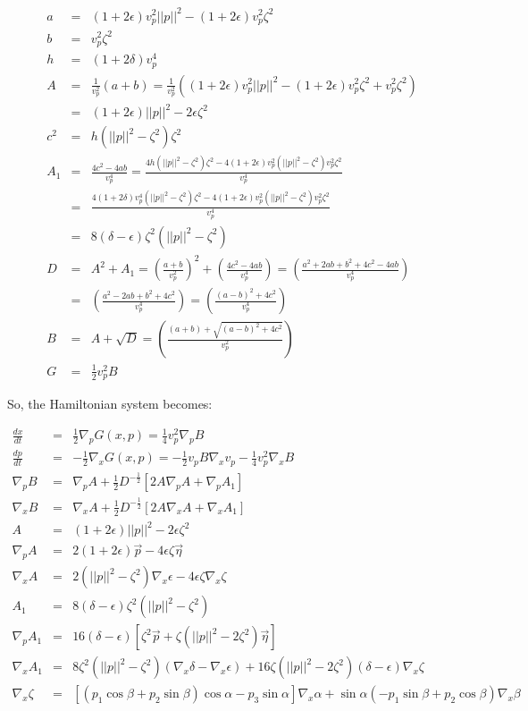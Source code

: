 \documentclass[12pt]{article}
\begin{document}
\begin{eqnarray}
a  &=& (1+2\epsilon)v_p^2||p||^2-(1+2\epsilon)v_p^2\zeta^2 \\
b  &=& v_p^2\zeta^2 \\
h  &=& (1+2\delta)v_p^4 \\
A  &=& \frac{1}{v_p^2}\left(a+b\right)= \frac{1}{v_p^2}\left((1+2\epsilon)v_p^2||p||^2-(1+2\epsilon)v_p^2\zeta^2+v_p^2\zeta^2\right)\\
   &=& (1+2\epsilon)||p||^2-2\epsilon\zeta^2 \\
c^2&=& h(||p||^2-\zeta^2)\zeta^2 \\
A_1&=& \frac{4c^2-4ab}{v_p^4}=\frac{4h(||p||^2-\zeta^2)\zeta^2-4(1+2\epsilon)v_p^2(||p||^2-\zeta^2)v_p^2\zeta^2}{v_p^4}\\
   &=& \frac{4(1+2\delta)v_p^4(||p||^2-\zeta^2)\zeta^2-4(1+2\epsilon)v_p^2(||p||^2-\zeta^2)v_p^2\zeta^2}{v_p^4}\\
   &=& 8(\delta-\epsilon)\zeta^2(||p||^2-\zeta^2) \\
D  &=& A^2+A_1 = \left(\frac{a+b}{v_p^2}\right)^2 + \left(\frac{4c^2-4ab}{v_p^4}\right) = \left(\frac{a^2+2ab+b^2+4c^2-4ab}{v_p^4}\right) \nonumber \\
   &=& \left(\frac{a^2-2ab+b^2+4c^2}{v_p^4}\right) = \left(\frac{(a-b)^2+4c^2}{v_p^4}\right) \\
B  &=& A+\sqrt{D} = \left(\frac{(a+b)+\sqrt{(a-b)^2+4c^2}}{v_p^2}\right)\\
G  &=& \frac{1}{2} v_p^2 B
\end{eqnarray}

So, the Hamiltonian system becomes:

\begin{eqnarray}
\frac{dx}{dt}   &=&  \frac{1}{2}\nabla_p G(x,p) =  \frac{1}{4}v_p^2\nabla_pB\\
\frac{dp}{dt}   &=& -\frac{1}{2}\nabla_x G(x,p) = -\frac{1}{2}v_pB\nabla_xv_p-\frac{1}{4}v_p^2\nabla_xB\\
\nabla_p B      &=&  \nabla_p A+\frac{1}{2}D^{-\frac{1}{2}}\left[2A\nabla_p A + \nabla_p A_1\right]\\
\nabla_x B      &=&  \nabla_x A+\frac{1}{2}D^{-\frac{1}{2}}\left[2A\nabla_x A + \nabla_x A_1\right]\\
A               &=&  (1+2\epsilon)||p||^2-2\epsilon\zeta^2 \\
\nabla_p A      &=&  2(1+2\epsilon)\vec{p}-4\epsilon\zeta\vec{\eta}\\
\nabla_x A      &=&  2(||p||^2-\zeta^2)\nabla_x \epsilon - 4\epsilon\zeta\nabla_x \zeta\\
A_1             &=&  8(\delta-\epsilon)\zeta^2(||p||^2-\zeta^2) \\
\nabla_p A_1    &=&  16(\delta-\epsilon)\left[\zeta^2\vec{p}+\zeta(||p||^2-2\zeta^2)\vec{\eta}\right]\\
\nabla_x A_1    &=&  8\zeta^2(||p||^2-\zeta^2)(\nabla_x \delta - \nabla_x \epsilon) + 16\zeta(||p||^2-2\zeta^2)(\delta-\epsilon)\nabla_x \zeta \nonumber\\
\nabla_x \zeta  &=&  \left[(p_1 \cos \beta + p_2 \sin \beta)\cos \alpha - p_3 \sin \alpha \right] \nabla_x \alpha + \sin \alpha (-p_1 \sin \beta + p_2 \cos \beta)\nabla_x \beta \nonumber
\end{eqnarray}
\end{document}

